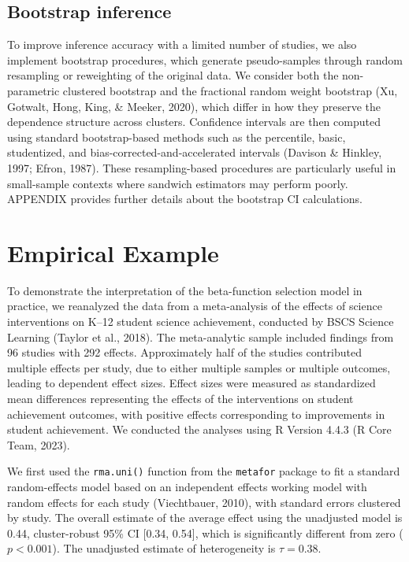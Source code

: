 \documentclass[
  american,
  man, donotrepeattitle,floatsintext]{apa7}
\begin{document}
\subsection{Bootstrap inference}\label{bootstrap-inference}

To improve inference accuracy with a limited number of studies, we also implement bootstrap procedures, which generate pseudo-samples through random resampling or reweighting of the original data. We consider both the non-parametric clustered bootstrap and the fractional random weight bootstrap (Xu, Gotwalt, Hong, King, \& Meeker, 2020), which differ in how they preserve the dependence structure across clusters. Confidence intervals are then computed using standard bootstrap-based methods such as the percentile, basic, studentized, and bias-corrected-and-accelerated intervals (Davison \& Hinkley, 1997; Efron, 1987). These resampling-based procedures are particularly useful in small-sample contexts where sandwich estimators may perform poorly. APPENDIX provides further details about the bootstrap CI calculations.

\section{Empirical Example}\label{empirical-example}

To demonstrate the interpretation of the beta-function selection model in practice, we reanalyzed the data from a meta-analysis of the effects of science interventions on K--12 student science achievement, conducted by BSCS Science Learning (Taylor et al., 2018). The meta-analytic sample included findings from 96 studies with 292 effects. Approximately half of the studies contributed multiple effects per study, due to either multiple samples or multiple outcomes, leading to dependent effect sizes. Effect sizes were measured as standardized mean differences representing the effects of the interventions on student achievement outcomes, with positive effects corresponding to improvements in student achievement. We conducted the analyses using R Version 4.4.3 (R Core Team, 2023).

We first used the \texttt{rma.uni()} function from the \texttt{metafor} package to fit a standard random-effects model based on an independent effects working model with random effects for each study (Viechtbauer, 2010), with standard errors clustered by study.
The overall estimate of the average effect using the unadjusted model is 0.44, cluster-robust 95\% CI {[}0.34, 0.54{]}, which is significantly different from zero (\(p <0.001\)).
The unadjusted estimate of heterogeneity is \(\tau = 0.38\).
\end{document}
